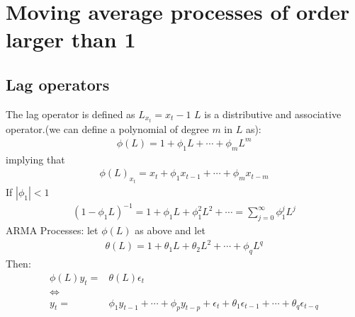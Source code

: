 \documentclass[a4paper,twoside,11pt]{article}
\begin{document}
\section{Moving average processes of order larger than 1}
\subsection{Lag operators}
\noindent The lag operator is defined as $L_{x_t}=x_t-1$
\newline
$L$ is a distributive and associative operator.(we can define a polynomial of degree $m$ in $L$ as):
\begin{equation*}
\begin{aligned}
\phi(L) = 1+ \phi_1 L + \cdots + \phi_m L^m
\end{aligned}
\end{equation*}
implying that
\begin{equation*}
\begin{aligned}
\phi(L)_{x_t} = x_t + \phi_1 x_{t-1} + \cdots + \phi_m x_{t-m}
\end{aligned}
\end{equation*}
If $|\phi_1| <1$ 
\begin{equation*}
\begin{aligned}
(1- \phi_1 L)^{-1} = 1+ \phi_1 L + \phi_1^2 L^2 + \cdots = \sum^\infty_{j=0} \phi_1^j L^j
\end{aligned}
\end{equation*}
ARMA Processes: let $\phi(L)$ as above and let 
\begin{equation*}
\begin{aligned}
\theta(L)=1+\theta_1 L + \theta_2 L^2 + \cdots + \phi_q L^q 
\end{aligned}
\end{equation*}
Then:
\begin{equation*}
\begin{aligned}
\phi(L)y_t =& \theta(L) \epsilon_t \\
\Leftrightarrow \\
y_t =& \phi_1 y_{t-1} + \cdots + \phi_p y_{t-p} + \epsilon_t +\theta_1 \epsilon_{t-1}+\cdots +\theta_q \epsilon_{t-q}
\end{aligned}
\end{equation*}
\end{document}
